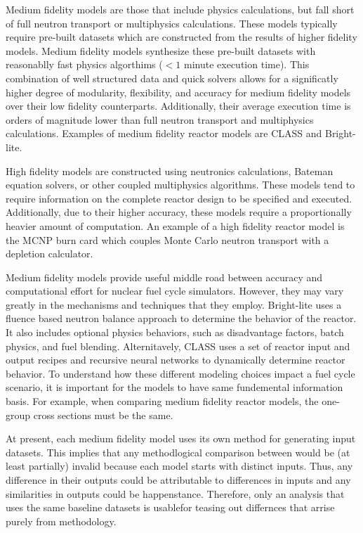 \documentclass{article}
\begin{document}
Medium fidelity models are those that include physics calculations, but fall short of
full neutron transport or multiphysics calculations. These models typically require
pre-built datasets which are constructed from the results of higher fidelity models.
Medium fidelity models synthesize these pre-built datasets with reasonablly fast physics
algorthims ($<1$ minute execution time). This combination of well structured data and
quick solvers allows for a significatly higher degree of modularity, flexibility, and accuracy
for medium fidelity models over their low fidelity counterparts. Additionally, their average
execution time is orders of magnitude lower than full neutron transport and multiphysics
calculations. Examples of medium fidelity reactor models are CLASS\cite{class}
and Bright-lite\cite{brightlite,flanagan}.

High fidelity models are constructed using neutronics calculations, Bateman
equation solvers\cite{bateman1910, bateman}, or other coupled multiphysics algorithms. These models tend
to require information on the complete reactor design to be specified and executed.
Additionally, due to their higher accuracy, these models require a proportionally heavier amount
of computation. An example of a high fidelity reactor model is the
MCNP\cite{mcnp5monte} burn card which couples Monte Carlo neutron transport with a depletion
calculator.

Medium fidelity models provide useful middle road between accuracy and computational effort
for nuclear fuel cycle simulators. However, they may vary greatly in the mechanisms and
techniques that they employ. Bright-lite uses a fluence based neutron balance approach to
determine the behavior of the reactor. It also includes optional physics behaviors, such as
disadvantage factors, batch physics, and fuel blending. Alternitavely, CLASS uses a set of
reactor input and output recipes and recursive neural networks\cite{classneural} to dynamically determine
reactor behavior. To understand how these different modeling choices impact a fuel cycle
scenario, it is important for the models to have same fundemental information basis.
For example, when comparing medium fidelity reactor models, the one-group cross sections
must be the same.

At present, each medium fidelity model uses its own method for generating input datasets.
This implies that any methodlogical comparison between would be (at least partially) invalid
because each model starts with distinct inputs. Thus, any difference in their outputs
could be attributable to differences in inputs and any similarities in outputs could be
happenstance. Therefore, only an analysis that uses the same baseline datasets
is usablefor teasing out differnces that arrise purely from methodology.
\end{document}
